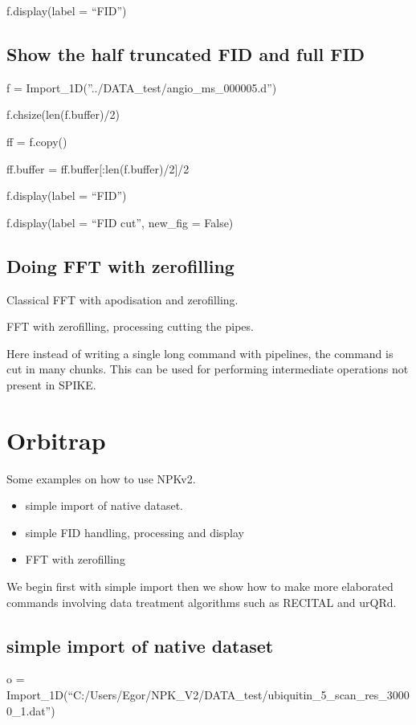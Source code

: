 \documentclass[letterpaper,10pt,openany,oneside]{sphinxmanual}
\begin{document}
f.display(label = ``FID'')


\subsection{Show the half truncated FID and full FID}
\label{rst/tutorial:show-the-half-truncated-fid-and-full-fid}
f = Import\_1D(''../DATA\_test/angio\_ms\_000005.d'')

f.chsize(len(f.buffer)/2)

ff = f.copy()

ff.buffer = ff.buffer{[}:len(f.buffer)/2{]}/2

f.display(label = ``FID'')

f.display(label = ``FID cut'', new\_fig = False)


\subsection{Doing FFT with zerofilling}
\label{rst/tutorial:doing-fft-with-zerofilling}
Classical FFT with apodisation and zerofilling.

FFT with zerofilling, processing cutting the pipes.

Here instead of writing a single long command with pipelines, the command is cut in many chunks.
This can be used for performing intermediate operations not present in SPIKE.


\section{Orbitrap}
\label{rst/tutorial:orbitrap}
Some examples on how to use NPKv2.
\begin{itemize}
\item {} 
simple import of native dataset.

\item {} 
simple FID handling, processing and display

\item {} 
FFT with zerofilling

\end{itemize}

We begin first with simple import then we show how to make more elaborated commands involving data treatment algorithms such as RECITAL and urQRd.


\subsection{simple import of native dataset}
\label{rst/tutorial:id1}
o = Import\_1D(``C:/Users/Egor/NPK\_V2/DATA\_test/ubiquitin\_5\_scan\_res\_30000\_1.dat'')
\end{document}

